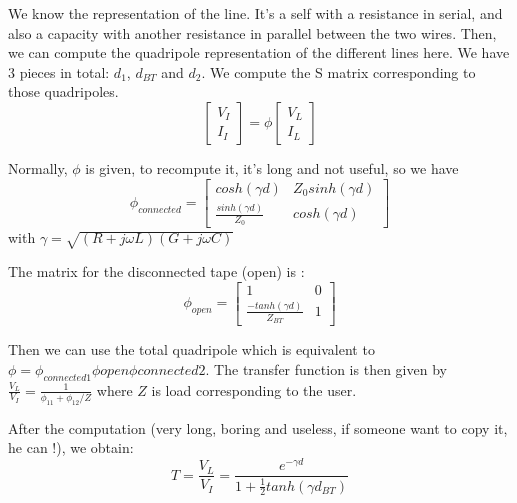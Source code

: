 \begin{solution}
	We know the representation of the line. It's a self with a resistance in serial, and also a capacity with another resistance in parallel between the two wires.
	Then, we can compute the quadripole representation of the different lines here. We have 3 pieces in total: $d_1$, $d_{BT}$ and $d_2$. We compute the S matrix corresponding to those quadripoles.
	$$
	\left[
	\begin{array}{c}
	V_I \\ 
	I_I
	\end{array}
	\right] 
	= 
	\phi
	\left[
	\begin{array}{c}
	V_L \\ 
	I_L
	\end{array}
	\right] 
	$$
	
	Normally, $\phi$ is given, to recompute it, it's long and not useful, so we have 
	$$\phi_{connected} =
	\left[
	\begin{array}{cc}
	cosh(\gamma d) & Z_0 sinh(\gamma d) \\ 
	\frac{sinh(\gamma d)}{Z_0} & cosh(\gamma d)
	\end{array} 
	\right]$$	
	with $\gamma = \sqrt{(R + j\omega L)(G + j \omega C)}$
	
	The matrix for the disconnected tape (open) is :
	$$\phi_{open} =
	\left[
	\begin{array}{cc}
	1 & 0 \\ 
	\frac{-tanh(\gamma d)}{Z_{BT}} & 1
	\end{array} 
	\right]$$	
	
	Then we can use the total quadripole which is equivalent to $\phi = \phi_{connected 1} \phi{open} \phi{connected 2}$. The transfer function is then given by $\frac{V_L}{V_I} = \frac{1}{\phi_{11} + \phi_{12}/Z}$ where $Z$ is load corresponding to the user.
	
	After the computation (very long, boring and useless, if someone want to copy it, he can !), we obtain: 
	$$T = \frac{V_L}{V_I} = \frac{e^{-\gamma d}}{1 + \frac{1}{2}tanh(\gamma d_{BT})}$$
\end{solution}